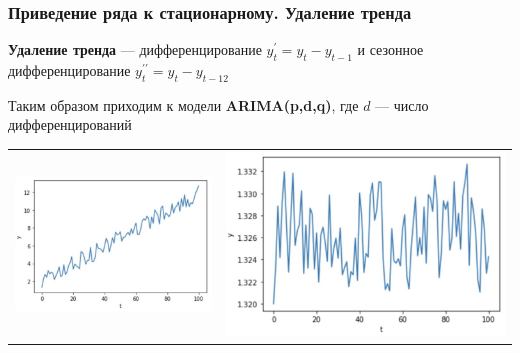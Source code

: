 \documentclass[fullscreen=true, bookmarks=true, hyperref={pdfencoding=unicode}]{beamer}
\begin{document}
\begin{frame}
  \frametitle{Приведение ряда к стационарному. Удаление тренда}

  {\bf Удаление тренда} — дифференцирование $y^\prime_t = y_t - y_{t-1}$ и сезонное дифференцирование $y^{\prime\prime}_t = y_t - y_{t-12}$

  \vspace{0.5cm}
  Таким образом приходим к модели {\bf ARIMA(p,d,q)}, где $d$ — число дифференцирований

  \vspace{0.5cm}
  \begin{tabular}{cc}
    \hspace{-1cm}\includegraphics[keepaspectratio,
                     width=.45\paperwidth]{lin_unstationary.jpg}
    &
    \includegraphics[keepaspectratio,
                     width=.45\paperwidth]{autoregression.jpg}
  \end{tabular}
  \begin{center}
  \end{center}
\end{frame}
\end{document}
